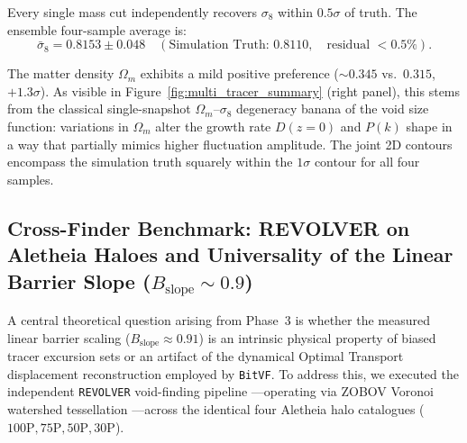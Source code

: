 \documentclass[12pt]{report}
\begin{document}
Every single mass cut independently recovers $\sigma_8$ within $0.5\sigma$ of truth. The ensemble four-sample average is:
\begin{equation}
    \bar{\sigma}_8 = \mathbf{0.8153 \pm 0.048} \quad (\text{Simulation Truth: } \mathbf{0.8110}, \quad \text{residual } < 0.5\%).
\end{equation}

The matter density $\Omega_m$ exhibits a mild positive preference ($\sim 0.345$ vs.\ $0.315$, $+1.3\sigma$). As visible in Figure~\ref{fig:multi_tracer_summary} (right panel), this stems from the classical single-snapshot $\Omega_m$--$\sigma_8$ degeneracy banana of the void size function: variations in $\Omega_m$ alter the growth rate $D(z=0)$ and $P(k)$ shape in a way that partially mimics higher fluctuation amplitude. The joint 2D contours encompass the simulation truth squarely within the $1\sigma$ contour for all four samples.

\subsection{Cross-Finder Benchmark: REVOLVER on Aletheia Haloes and Universality of the Linear Barrier Slope ($B_{\mathrm{slope}} \sim 0.9$)}
\label{sec:revolver_universality}

A central theoretical question arising from Phase~3 is whether the measured linear barrier scaling ($B_{\mathrm{slope}} \approx 0.91$) is an intrinsic physical property of biased tracer excursion sets or an artifact of the dynamical Optimal Transport displacement reconstruction employed by \texttt{BitVF}. To address this, we executed the independent \texttt{REVOLVER} void-finding pipeline \citep{Nadathur2019}---operating via ZOBOV Voronoi watershed tessellation \citep{Neyrinck2008}---across the identical four Aletheia halo catalogues ($100\mathrm{P}, 75\mathrm{P}, 50\mathrm{P}, 30\mathrm{P}$).
\end{document}

